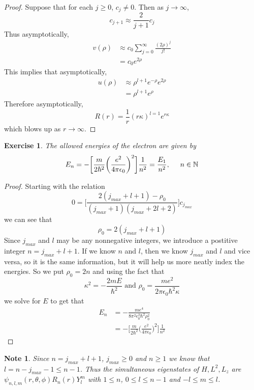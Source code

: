 \documentclass[12pt]{amsart}
\newtheorem{note}[thm]{Note}
\newtheorem{ex}[thm]{Exercise}
\newcommand{\ep}{\epsilon}
\newcommand{\N}{\mathbb{N}}
\begin{document}
\begin{proof}
Suppose that for each $j \geq 0$, $c_{j} \neq 0$. Then as $j \rightarrow \infty$, $$c_{j+1} \approx \frac{2}{j+1}c_j$$ Thus asymptotically, 
\begin{align*}
v(\rho) 
& \approx c_0\sum_{j=0}^\infty \frac{(2\rho)^j}{j!} \\ 
&= c_0e^{2\rho}
\end{align*} 
This implies that asymptotically, 
\begin{align*}
u(\rho)
&\approx \rho^{l+1}e^{-\rho}e^{2\rho} \\
&= \rho^{l+1}e^{\rho}
\end{align*} Therefore asymptotically, $$R(r) = \frac{1}{r}(r\kappa)^{l=1}e^{r\kappa}$$ which blows up as $r \rightarrow \infty$.
\end{proof}

\begin{ex}
The allowed energies of the electron are given by $$E_n = - \bigg[\frac{m}{2\hbar^2}\bigg(\frac{e^2}{4 \pi \ep_0}\bigg)^2 \bigg] \frac{1}{n^2} = \frac{E_1}{n^2}, \hspace{.5cm} n \in \N$$
\end{ex}

\begin{proof}
Starting with the relation $$0 = \bigg[ \frac{2(j_{max}+l+1) - \rho_0}{(j_{max}+1)(j_{max}+2l+2)}\bigg]c_{j_{max}}$$ we can see that  $$\rho_0 = 2(j_{max} + l + 1)$$ Since $j_{max}$ and $l$ may be any nonnegative integers, we introduce a postitive integer $n = j_{max} + l + 1$. If we know $n$ and $l$, then we know $j_{max}$ and $l$ and vice versa, so it is the same information, but it will help us more neatly index the energies. So we put $\rho_0 = 2n$ and using the fact that $$\kappa^2 = -\frac{2mE}{\hbar^2}\text{ and } \rho_0 = \frac{me^2}{2\pi\ep_0 \hbar^2 \kappa}$$ we solve for $E$ to get that
\begin{align*}
E_n 
&= -\frac{me^4}{8\pi^2 \ep_0^2 \hbar^2 \rho_0^2}\\
&= -\bigg[\frac{m}{2\hbar^2}\bigg(\frac{e^2}{4 \pi \ep_0}\bigg)^2 \bigg] \frac{1}{n^2}
\end{align*} 
\end{proof}

\begin{note}
Since $n = j_{max} + l + 1$, $j_{max} \geq 0$ and $n \geq 1$ we know that $l = n - j_{max} - 1 \leq n-1$. Thus the simultaneous eigenstates of $H, L^2, L_z$ are $\psi_{n, l, m}(r, \theta, \phi)R_n(r)Y_l^m$ with $1 \leq n$, $0 \leq l \leq n-1$ and $-l \leq m \leq l$. 
\end{note}
\end{document}
